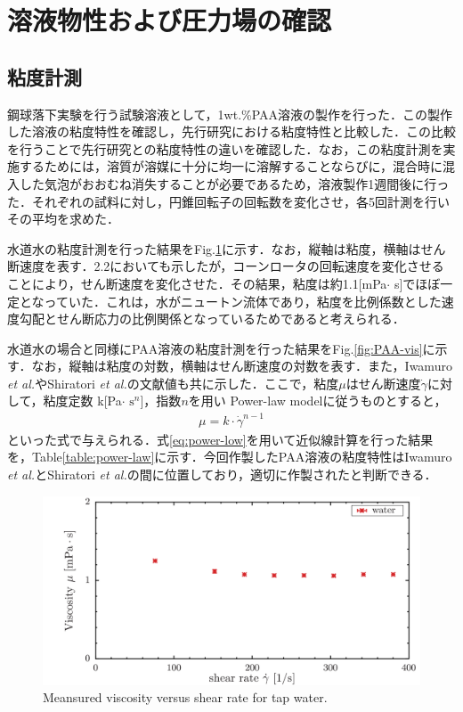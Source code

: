 \section{溶液物性および圧力場の確認}
\subsection{粘度計測}
鋼球落下実験を行う試験溶液として，1wt.\%PAA溶液の製作を行った．この製作した溶液の粘度特性を確認し，先行研究\cite{ref:9}\cite{ref:10}における粘度特性と比較した．この比較を行うことで先行研究との粘度特性の違いを確認した．なお，この粘度計測を実施するためには，溶質が溶媒に十分に均一に溶解することならびに，混合時に混入した気泡がおおむね消失することが必要であるため，溶液製作1週間後に行った．それぞれの試料に対し，円錐回転子の回転数を変化させ，各5回計測を行いその平均を求めた．

水道水の粘度計測を行った結果をFig.\ref{fig:water-vis}に示す．なお，縦軸は粘度，横軸はせん断速度を表す．2.2においても示したが，コーンロータの回転速度を変化させることにより，せん断速度を変化させた．その結果，粘度は約1.1[mPa$\cdot$ s]でほぼ一定となっていた．これは，水がニュートン流体であり，粘度を比例係数とした速度勾配とせん断応力の比例関係となっているためであると考えられる．

水道水の場合と同様にPAA溶液の粘度計測を行った結果をFig.\ref{fig:PAA-vis}に示す．なお，縦軸は粘度の対数，横軸はせん断速度の対数を表す．また，Iwamuro {\it et al.}\cite{ref:9}やShiratori {\it et al.}\cite{ref:10}の文献値も共に示した．ここで，粘度$\mu$はせん断速度$\dot{\gamma}$に対して，粘度定数 k[Pa$\cdot$ $\text{s}^n$]，指数$n$を用い Power-law modelに従うものとすると，
\begin{eqnarray}
    \label{eq:power-low}
    \mu=k\cdot\dot{\gamma}^{n-1}
\end{eqnarray}
といった式で与えられる\cite{ref:1}．式\ref{eq:power-low}を用いて近似線計算を行った結果を，Table\ref{table:power-law}に示す．今回作製したPAA溶液の粘度特性はIwamuro {\it et al.}とShiratori {\it et al.}の間に位置しており，適切に作製されたと判断できる．

\begin{figure}[ht]
    \centering
    \includegraphics[width=12cm,clip]{4-Results/water.png}
    \caption{Meansured viscosity versus shear rate for tap water.}
    \label{fig:water-vis}
\end{figure}

